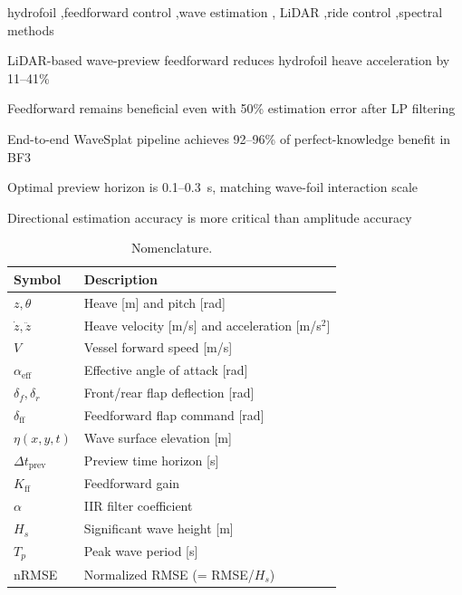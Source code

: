 \documentclass[review]{elsarticle}
\begin{document}
\begin{frontmatter}
\begin{keyword}
hydrofoil \sep feedforward control \sep wave estimation \sep
LiDAR \sep ride control \sep spectral methods
\end{keyword}

\begin{highlights}
\item LiDAR-based wave-preview feedforward reduces hydrofoil heave acceleration by 11--41\%
\item Feedforward remains beneficial even with 50\% estimation error after LP filtering
\item End-to-end WaveSplat pipeline achieves 92--96\% of perfect-knowledge benefit in BF3
\item Optimal preview horizon is 0.1--0.3~s, matching wave-foil interaction scale
\item Directional estimation accuracy is more critical than amplitude accuracy
\end{highlights}

\end{frontmatter}

\linenumbers

\begin{table}[h]
\centering
\caption{Nomenclature.}
\label{tab:nomenclature}
\begin{tabular}{ll}
\toprule
Symbol & Description \\
\midrule
$z, \theta$ & Heave [m] and pitch [rad] \\
$\dot{z}, \ddot{z}$ & Heave velocity [m/s] and acceleration [m/s$^2$] \\
$V$ & Vessel forward speed [m/s] \\
$\alpha_\text{eff}$ & Effective angle of attack [rad] \\
$\delta_f, \delta_r$ & Front/rear flap deflection [rad] \\
$\delta_\text{ff}$ & Feedforward flap command [rad] \\
$\eta(x,y,t)$ & Wave surface elevation [m] \\
$\Delta t_\text{prev}$ & Preview time horizon [s] \\
$K_\text{ff}$ & Feedforward gain \\
$\alpha$ & IIR filter coefficient \\
$H_s$ & Significant wave height [m] \\
$T_p$ & Peak wave period [s] \\
nRMSE & Normalized RMSE (= RMSE/$H_s$) \\
\bottomrule
\end{tabular}
\end{table}
\end{document}
